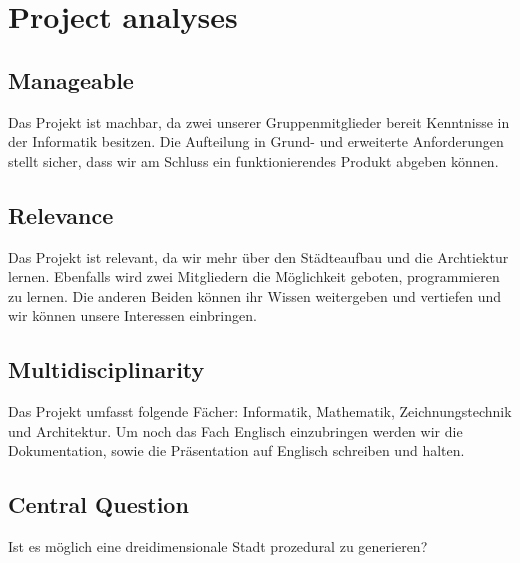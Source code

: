\section{Project analyses}

\subsection{Manageable}
Das Projekt ist machbar, da zwei unserer Gruppenmitglieder bereit Kenntnisse in der Informatik besitzen. Die Aufteilung in Grund- und erweiterte Anforderungen stellt sicher, dass wir am Schluss ein funktionierendes Produkt abgeben können.

\subsection{Relevance}
Das Projekt ist relevant, da wir mehr über den Städteaufbau und die Archtiektur lernen. Ebenfalls wird zwei Mitgliedern die Möglichkeit geboten, programmieren zu lernen. Die anderen Beiden können ihr Wissen weitergeben und vertiefen und wir können unsere Interessen einbringen.  

\subsection{Multidisciplinarity}
Das Projekt umfasst folgende Fächer: Informatik, Mathematik, Zeichnungstechnik und Architektur. Um noch das Fach Englisch einzubringen werden wir die Dokumentation, sowie die Präsentation auf Englisch schreiben und halten. 

\subsection{Central Question}
Ist es möglich eine dreidimensionale Stadt prozedural zu generieren?